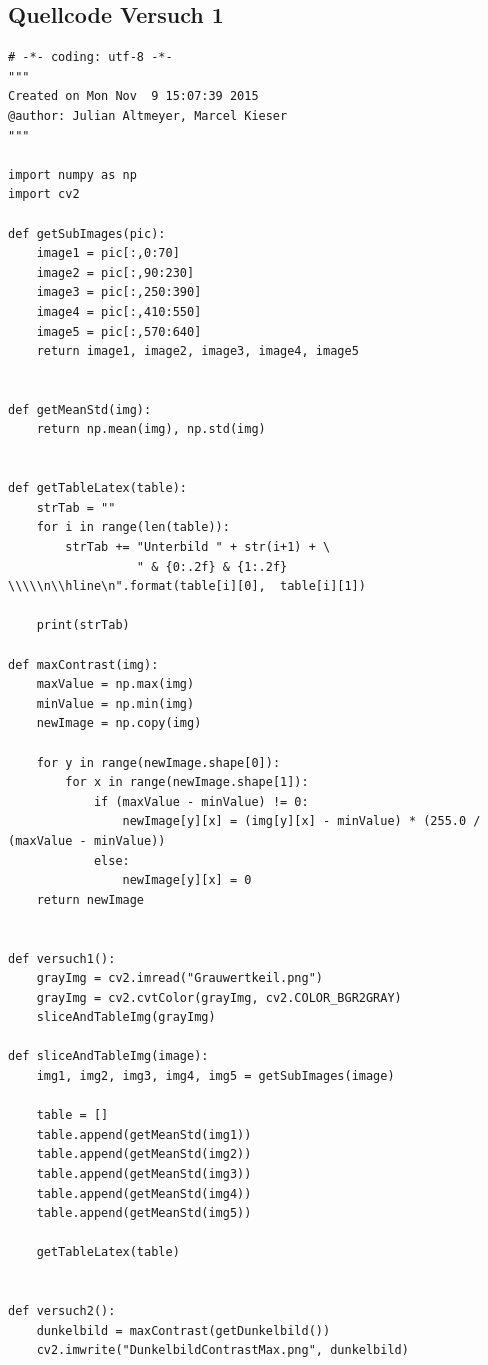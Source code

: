 \documentclass[12pt,oneside,a4paper]{report}
\begin{document}
\subsection{Quellcode Versuch 1}
\label{chap:APPENDIX_SOURCECODE_V1}
\begin{lstlisting}[style=PYTHON, frame=single, caption=QuellCodeV1 bis V4, captionpos=b, label=lst:CodeV2]
# -*- coding: utf-8 -*-
"""
Created on Mon Nov  9 15:07:39 2015
@author: Julian Altmeyer, Marcel Kieser
"""

import numpy as np
import cv2

def getSubImages(pic):
    image1 = pic[:,0:70]
    image2 = pic[:,90:230]
    image3 = pic[:,250:390]
    image4 = pic[:,410:550]
    image5 = pic[:,570:640]
    return image1, image2, image3, image4, image5


def getMeanStd(img):
    return np.mean(img), np.std(img)


def getTableLatex(table):
    strTab = ""
    for i in range(len(table)):
        strTab += "Unterbild " + str(i+1) + \
                  " & {0:.2f} & {1:.2f} \\\\\n\\hline\n".format(table[i][0],  table[i][1])

    print(strTab)

def maxContrast(img):
    maxValue = np.max(img)
    minValue = np.min(img)
    newImage = np.copy(img)
    
    for y in range(newImage.shape[0]):
        for x in range(newImage.shape[1]):
            if (maxValue - minValue) != 0:
                newImage[y][x] = (img[y][x] - minValue) * (255.0 / (maxValue - minValue))
            else:
                newImage[y][x] = 0
    return newImage


def versuch1():
    grayImg = cv2.imread("Grauwertkeil.png")    
    grayImg = cv2.cvtColor(grayImg, cv2.COLOR_BGR2GRAY)
    sliceAndTableImg(grayImg)

def sliceAndTableImg(image):    
    img1, img2, img3, img4, img5 = getSubImages(image)
    
    table = []
    table.append(getMeanStd(img1))
    table.append(getMeanStd(img2))
    table.append(getMeanStd(img3))
    table.append(getMeanStd(img4))
    table.append(getMeanStd(img5))
    
    getTableLatex(table)


def versuch2():
    dunkelbild = maxContrast(getDunkelbild())
    cv2.imwrite("DunkelbildContrastMax.png", dunkelbild)


\end{lstlisting}
\end{document}
